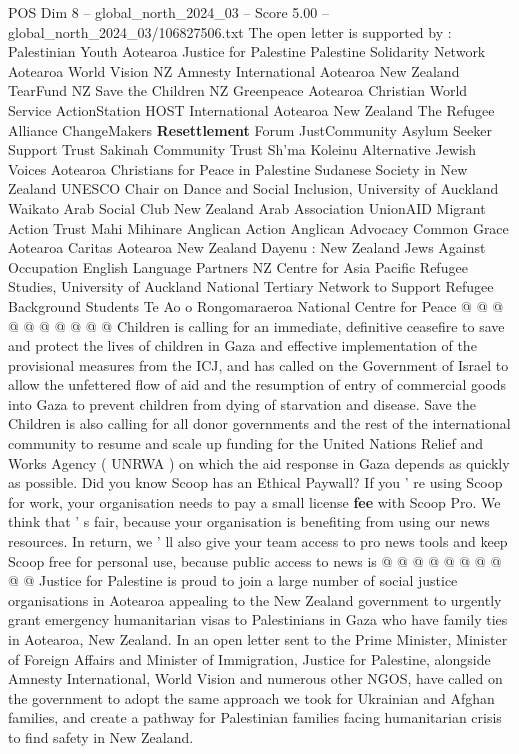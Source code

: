 \begin{textsample}{POS Dim 8 – global\_north\_2024\_03 – Score 5.00 – global\_north\_2024\_03/106827506.txt}
The open letter is supported by : Palestinian Youth Aotearoa Justice for Palestine Palestine Solidarity Network Aotearoa World Vision NZ Amnesty International Aotearoa New Zealand TearFund NZ Save the Children NZ Greenpeace Aotearoa Christian World Service ActionStation HOST International Aotearoa New Zealand The Refugee Alliance ChangeMakers \textbf{Resettlement} Forum JustCommunity Asylum Seeker Support Trust Sakinah Community Trust Sh'ma Koleinu Alternative Jewish Voices Aotearoa Christians for Peace in Palestine Sudanese Society in New Zealand UNESCO Chair on Dance and Social Inclusion, University of Auckland Waikato Arab Social Club New Zealand Arab Association UnionAID Migrant Action Trust Mahi Mihinare Anglican Action Anglican Advocacy Common Grace Aotearoa Caritas Aotearoa New Zealand Dayenu : New Zealand Jews Against Occupation English Language Partners NZ Centre for Asia Pacific Refugee Studies, University of Auckland National Tertiary Network to Support Refugee Background Students Te Ao o Rongomaraeroa National Centre for Peace @ @ @ @ @ @ @ @ @ @ Children is calling for an immediate, definitive ceasefire to save and protect the lives of children in Gaza and effective implementation of the provisional measures from the ICJ, and has called on the Government of Israel to allow the unfettered flow of aid and the resumption of entry of commercial goods into Gaza to prevent children from dying of starvation and disease.
Save the Children is also calling for all donor governments and the rest of the international community to resume and scale up funding for the United Nations Relief and Works Agency ( UNRWA ) on which the aid response in Gaza depends as quickly as possible.
Did you know Scoop has an Ethical Paywall?
If you ' re using Scoop for work, your organisation needs to pay a small license \textbf{fee} with Scoop Pro.
We think that ' s fair, because your organisation is benefiting from using our news resources.
In return, we ' ll also give your team access to pro news tools and keep Scoop free for personal use, because public access to news is @ @ @ @ @ @ @ @ @ @ Justice for Palestine is proud to join a large number of social justice organisations in Aotearoa appealing to the New Zealand government to urgently grant emergency humanitarian visas to Palestinians in Gaza who have family ties in Aotearoa, New Zealand.
In an open letter sent to the Prime Minister, Minister of Foreign Affairs and Minister of Immigration, Justice for Palestine, alongside Amnesty International, World Vision and numerous other NGOS, have called on the government to adopt the same approach we took for Ukrainian and Afghan families, and create a pathway for Palestinian families facing humanitarian crisis to find safety in New Zealand.

\end{textsample}
